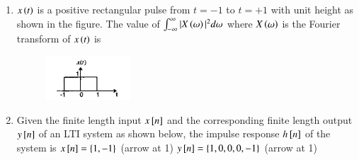 \documentclass[12pt]{article}
\theoremstyle{remark}
\begin{document}
\begin{enumerate}
\item $x\brak{t}$ is a positive rectangular pulse from $t=-1$ to $t=+1$ with unit height as shown in the figure. The value of $\int_{-\infty}^{\infty} |X\brak{\omega}|^2 d\omega$ where $X\brak{\omega}$ is the Fourier transform of $x\brak{t}$ is
\begin{figure}[H]
    \centering
    \includegraphics[width=0.3\textwidth]{Figs/Q31.png}
    \caption{}
    \label{fig:1.21}
\end{figure}
\begin{enumerate}
\end{enumerate}
\hfill{}
\item Given the finite length input $x\sbrak{n}$ and the corresponding finite length output $y\sbrak{n}$ of an LTI system as shown below, the impulse response $h\sbrak{n}$ of the system is
\newline $x\sbrak{n}=\{1, -1\}$ (arrow at 1)
\newline $y\sbrak{n}=\{1, 0, 0, 0, -1\}$ (arrow at 1)
\begin{enumerate}
\end{enumerate}
\hfill{}


\end{enumerate}
\end{document}

